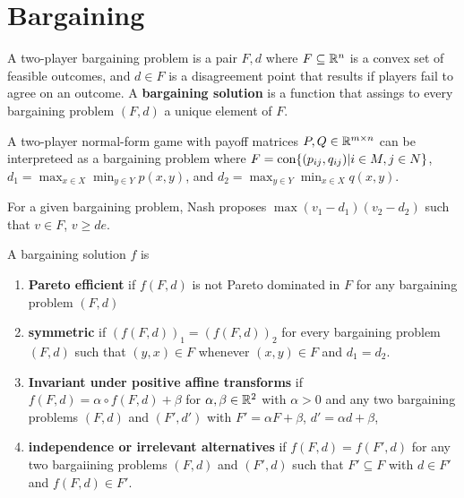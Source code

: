 \section{Bargaining}
\label{sec:bargaining}

\begin{defn}
  \label{sec:bargaining-1}
  A two-player bargaining problem is a pair $F, d$ where $F \subseteq
  \mathbb{R}^{n}$ is a convex set of feasible outcomes, and $d \in F$ is a
  disagreement point that results if players fail to agree on an
  outcome.  A \textbf{bargaining solution} is a function that assings
  to every bargaining problem $(F, d)$ a unique element of $F$.

  A two-player normal-form game with payoff matrices $P, Q \in \mathbb{R}^{m
    \times n}$ can be interpreteed as a bargaining problem where $F =
  \operatorname*{con} \{ (p_{ij}, q_{ij}) | i \in M, j \in N \} $, $d_{1} = \max_{x
    \in X} \min_{y \in Y} p(x, y)$, and $d_{2} = \max_{y \in Y}
  \min_{x \in X} q(x, y)$.
\end{defn}

\begin{thm}
  \label{sec:bargaining-2}
  For a given bargaining problem, Nash proposes $\max (v_{1} -
  d_{1})(v_{2} - d_{2})$ such that $v \in F$, $v \geq de$.
\end{thm}

\begin{defn}
  \label{sec:bargaining-3}
  A bargaining solution $f$ is
  \begin{enumerate}
  \item \textbf{Pareto efficient} if $f(F, d)$ is not Pareto dominated
    in $F$ for any bargaining problem $(F, d)$
  \item \textbf{symmetric} if $(f(F, d))_{1} = (f(F, d))_{2}$ for
    every bargaining problem $(F, d)$ such that $(y, x) \in F$
    whenever $(x, y) \in F$ and $d_{1} = d_{2}$.
  \item \textbf{Invariant under positive affine transforms} if $f(F, d) =
    \alpha \circ f(F, d) + \beta$ for $\alpha, \beta \in \mathbb{R}^{2}$ with
    $\alpha > 0$ and any two bargaining problems $(F, d)$ and $(F',
    d')$ with $F' = \alpha F + \beta$, $d' = \alpha d + \beta$,
  \item \textbf{independence or irrelevant alternatives} if $f(F, d) =
    f(F', d)$ for any two bargaiining problems $(F, d)$ and $(F', d)$
    such that $F' \subseteq F$ with $d \in F'$ and $f(F, d) \in F'$.
  \end{enumerate}
\end{defn}

